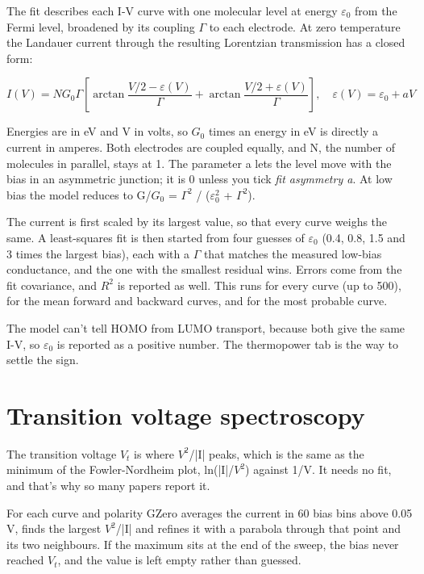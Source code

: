 \documentclass[
  11pt,
  a4paper,
]{article}
\begin{document}
The fit describes each I-V curve with one molecular level at energy
$\varepsilon_0$ from the Fermi level, broadened by its coupling $\Gamma$
to each electrode. At zero temperature the Landauer current through the
resulting Lorentzian transmission has a closed form:

\[
I(V) = N G_0 \Gamma \left[\arctan\frac{V/2 - \varepsilon(V)}{\Gamma} + \arctan\frac{V/2 + \varepsilon(V)}{\Gamma}\right], \quad \varepsilon(V) = \varepsilon_0 + aV
\]

Energies are in eV and V in volts, so $G_0$ times an energy in eV is
directly a current in amperes. Both electrodes are coupled equally, and
N, the number of molecules in parallel, stays at 1. The parameter a lets
the level move with the bias in an asymmetric junction; it is 0 unless
you tick \emph{fit asymmetry a}. At low bias the model reduces to
G/$G_0$ = $\Gamma^2$ / ($\varepsilon_0^2$ + $\Gamma^2$).

The current is first scaled by its largest value, so that every curve
weighs the same. A least-squares fit is then started from four guesses
of $\varepsilon_0$ (0.4, 0.8, 1.5 and 3 times the largest bias), each
with a $\Gamma$ that matches the measured low-bias conductance, and the
one with the smallest residual wins. Errors come from the fit
covariance, and $R^{2}$ is reported as well. This runs for every curve
(up to 500), for the mean forward and backward curves, and for the most
probable curve.

The model can't tell HOMO from LUMO transport, because both give the
same I-V, so $\varepsilon_0$ is reported as a positive number. The
thermopower tab is the way to settle the sign.

\hypertarget{transition-voltage-spectroscopy}{%
\section{Transition voltage
spectroscopy}\label{transition-voltage-spectroscopy}}

The transition voltage $V_t$ is where $V^{2}$/|I| peaks, which is the
same as the minimum of the Fowler-Nordheim plot, ln(|I|/$V^{2}$) against
1/V. It needs no fit, and that's why so many papers report it.

For each curve and polarity GZero averages the current in 60 bias bins
above 0.05 V, finds the largest $V^{2}$/|I| and refines it with a
parabola through that point and its two neighbours. If the maximum sits
at the end of the sweep, the bias never reached $V_t$, and the value is
left empty rather than guessed.
\end{document}

